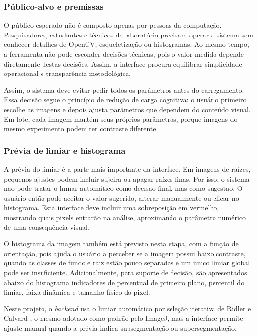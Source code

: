 \documentclass[12pt]{article}
\begin{document}
\subsubsection{Público-alvo e premissas}

O público esperado não é composto apenas por pessoas da computação. Pesquisadores, estudantes e técnicos de laboratório precisam operar o sistema sem conhecer detalhes de OpenCV, esqueletização ou histogramas. Ao mesmo tempo, a ferramenta não pode esconder decisões técnicas, pois o valor medido depende diretamente destas decisões. Assim, a interface procura equilibrar simplicidade operacional e transparência metodológica.

Assim, o sistema deve evitar pedir todos os parâmetros antes do carregamento. Essa decisão segue o princípio de redução de carga cognitiva: o usuário primeiro escolhe as imagens e depois ajusta parâmetros que dependem do conteúdo visual. Em lote, cada imagem mantém seus próprios parâmetros, porque imagens do mesmo experimento podem ter contraste diferente.

\subsubsection{Prévia de limiar e histograma}

A prévia do limiar é a parte mais importante da interface. Em imagens de raízes, pequenos ajustes podem incluir sujeira ou apagar raízes finas. Por isso, o sistema não pode tratar o limiar automático como decisão final, mas como sugestão. O usuário então pode aceitar o valor sugerido, alterar manualmente ou clicar no histograma. Esta interface deve incluir uma sobreposição em vermelho, mostrando quais pixels entrarão na análise, aproximando o parâmetro numérico de uma consequência visual.

O histograma da imagem também está previsto nesta etapa, com a função de orientação, pois ajuda o usuário a perceber se a imagem possui baixo contraste, quando as classes de fundo e raiz estão pouco separadas e um único limiar global pode ser insuficiente. Adicionalmente, para suporte de decisão, são apresentados abaixo do histograma indicadores de percentual de primeiro plano, percentil do limiar, faixa dinâmica e tamanho físico do pixel.

Neste projeto, o \textit{backend} usa o limiar automático por seleção iterativa de Ridler e Calvard \cite{ridler1978picture}, o mesmo adotado como padrão pelo ImageJ, mas a interface permite ajuste manual quando a prévia indica subsegmentação ou supersegmentação.
\end{document}
